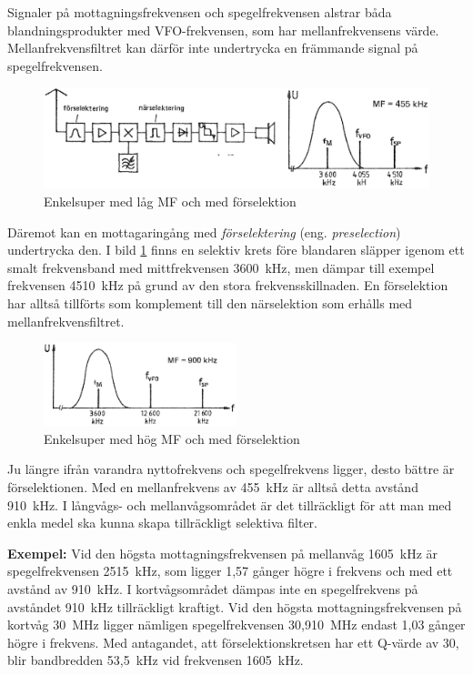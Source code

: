 Signaler på mottagningsfrekvensen och spegelfrekvensen alstrar båda
blandningsprodukter med VFO-frekvensen, som har mellanfrekvensens värde.
Mellanfrekvensfiltret kan därför inte undertrycka en främmande signal på
spegelfrekvensen.

\begin{figure}
  \includegraphics[width=\textwidth]{images/cropped_pdfs/bild_2_4-23.pdf}
  \caption{Enkelsuper med låg MF och med förselektion}
  \label{fig:bildII4-23}
\end{figure}

Däremot kan en mottagaringång med \emph{förselektering} (eng.
\emph{preselection}) undertrycka den.
I bild \ref{fig:bildII4-23} finns en selektiv krets före blandaren släpper
igenom ett smalt frekvensband med mittfrekvensen 3600~kHz, men dämpar till exempel
frekvensen 4510~kHz på grund av den stora frekvensskillnaden.
En förselektion har alltså tillförts som komplement till den närselektion som
erhålls med mellanfrekvensfiltret.

\begin{figure}
  \includegraphics[width=0.5\textwidth]{images/cropped_pdfs/bild_2_4-24.pdf}
  \caption{Enkelsuper med hög MF och med förselektion}
  \label{fig:bildII4-24}
\end{figure}

Ju längre ifrån varandra nyttofrekvens och spegelfrekvens ligger, desto bättre
är förselektionen.
Med en mellanfrekvens av 455~kHz är alltså detta avstånd 910~kHz.
I långvågs- och mellanvågsområdet är det tillräckligt för att man med enkla
medel ska kunna skapa tillräckligt selektiva filter.

\textbf{Exempel:}
Vid den högsta mottagningsfrekvensen på mellanvåg 1605~kHz är spegelfrekvensen
2515~kHz, som ligger 1,57 gånger högre i frekvens och med ett avstånd av
910~kHz.
I kortvågsområdet dämpas inte en spegelfrekvens på avståndet 910~kHz
tillräckligt kraftigt.
Vid den högsta mottagningsfrekvensen på kortvåg 30~MHz ligger nämligen
spegelfrekvensen 30,910~MHz endast 1,03 gånger högre i frekvens.
Med antagandet, att förselektionskretsen har ett Q-värde av 30, blir
bandbredden 53,5~kHz vid frekvensen 1605~kHz.

